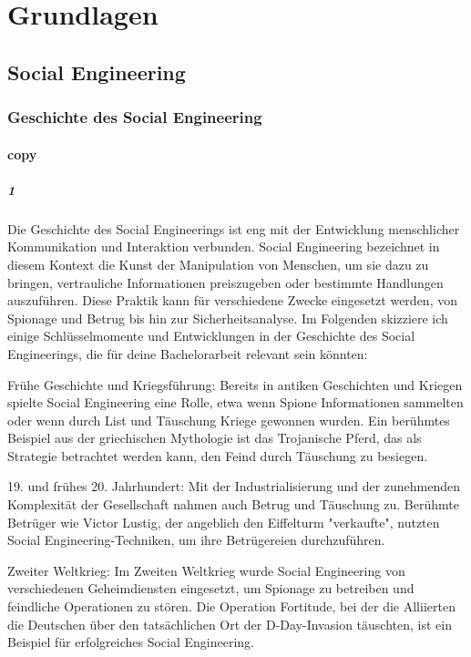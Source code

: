 \chapter{Grundlagen}\label{ch:Grundlagen}

\section{Social Engineering}

\subsection{Geschichte des Social Engineering}

\subsubsection*{copy}

\paragraph*{1}
Die Geschichte des Social Engineerings ist eng mit der Entwicklung menschlicher Kommunikation und Interaktion verbunden. Social Engineering bezeichnet in diesem Kontext die Kunst der Manipulation von Menschen, um sie dazu zu bringen, vertrauliche Informationen preiszugeben oder bestimmte Handlungen auszuführen. Diese Praktik kann für verschiedene Zwecke eingesetzt werden, von Spionage und Betrug bis hin zur Sicherheitsanalyse. Im Folgenden skizziere ich einige Schlüsselmomente und Entwicklungen in der Geschichte des Social Engineerings, die für deine Bachelorarbeit relevant sein könnten:

Frühe Geschichte und Kriegsführung: Bereits in antiken Geschichten und Kriegen spielte Social Engineering eine Rolle, etwa wenn Spione Informationen sammelten oder wenn durch List und Täuschung Kriege gewonnen wurden. Ein berühmtes Beispiel aus der griechischen Mythologie ist das Trojanische Pferd, das als Strategie betrachtet werden kann, den Feind durch Täuschung zu besiegen.

19. und frühes 20. Jahrhundert: Mit der Industrialisierung und der zunehmenden Komplexität der Gesellschaft nahmen auch Betrug und Täuschung zu. Berühmte Betrüger wie Victor Lustig, der angeblich den Eiffelturm "verkaufte", nutzten Social Engineering-Techniken, um ihre Betrügereien durchzuführen.

Zweiter Weltkrieg: Im Zweiten Weltkrieg wurde Social Engineering von verschiedenen Geheimdiensten eingesetzt, um Spionage zu betreiben und feindliche Operationen zu stören. Die Operation Fortitude, bei der die Alliierten die Deutschen über den tatsächlichen Ort der D-Day-Invasion täuschten, ist ein Beispiel für erfolgreiches Social Engineering.

